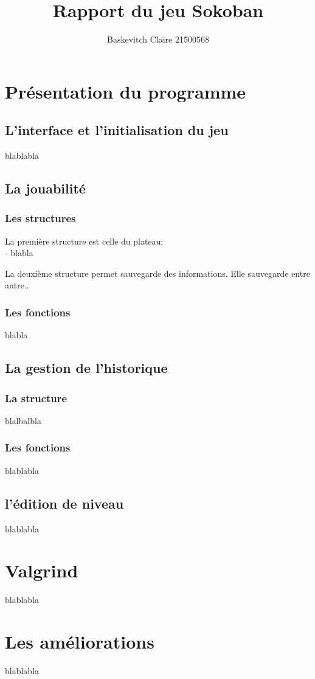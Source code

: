 \documentclass{report}
\title{\textbf{\huge Rapport du jeu Sokoban}}
\author{Baskevitch Claire 21500568}
\begin{document}
\maketitle


\part{Présentation du programme}
	\chapter{L'interface et l'initialisation du jeu}
blablabla
	\chapter{La jouabilité}
		\section{Les structures}
La première structure est celle du plateau:\\
- blabla


La deuxième structure permet sauvegarde des informations. Elle sauvegarde entre autre..
		\section{Les fonctions}
blabla
	\chapter{La gestion de l'historique}
		\section{La structure}
blalbalbla
		\section{Les fonctions}
blablabla
	\chapter{l'édition de niveau}
blablabla

\part{Valgrind} %
blablabla
\part{Les améliorations}
blablabla
\end{document}
